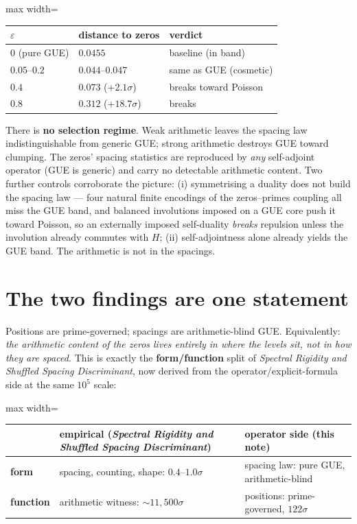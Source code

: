 \documentclass[11pt]{article}
\begin{document}
\begin{center}
\begin{adjustbox}{max width=\linewidth}\begin{tabular}{lll}
\toprule
$\varepsilon$ & distance to zeros & verdict \\
\midrule
$0$ (pure GUE) & $0.0455$ & baseline (in band) \\
$0.05$--$0.2$ & $0.044$--$0.047$ & same as GUE (cosmetic) \\
$0.4$ & $0.073$ ($+2.1\sigma$) & breaks toward Poisson \\
$0.8$ & $0.312$ ($+18.7\sigma$) & breaks \\
\bottomrule
\end{tabular}\end{adjustbox}
\end{center}

There is \textbf{no selection regime}. Weak arithmetic leaves the spacing law indistinguishable from generic GUE; strong arithmetic destroys GUE toward clumping. The zeros' spacing statistics are reproduced by \emph{any} self-adjoint operator (GUE is generic) and carry no detectable arithmetic content. Two further controls corroborate the picture: (i) symmetrising a duality does not build the spacing law --- four natural finite encodings of the zeros--primes coupling all miss the GUE band, and balanced involutions imposed on a GUE core push it toward Poisson, so an externally imposed self-duality \emph{breaks} repulsion unless the involution already commutes with $H$; (ii) self-adjointness alone already yields the GUE band. The arithmetic is not in the spacings.

\section{The two findings are one statement}

Positions are prime-governed; spacings are arithmetic-blind GUE. Equivalently: \emph{the arithmetic content of the zeros lives entirely in where the levels sit, not in how they are spaced.} This is exactly the \textbf{form/function} split of \textit{Spectral Rigidity and Shuffled Spacing Discriminant}, now derived from the operator/explicit-formula side at the same $10^5$ scale:

\begin{center}
\begin{adjustbox}{max width=\linewidth}\begin{tabular}{lll}
\toprule
& empirical (\textit{Spectral Rigidity and Shuffled Spacing Discriminant}) & operator side (this note) \\
\midrule
\textbf{form} & spacing, counting, shape: $0.4$--$1.0\sigma$ & spacing law: pure GUE, arithmetic-blind \\
\textbf{function} & arithmetic witness: $\sim\!11{,}500\sigma$ & positions: prime-governed, $122\sigma$ \\
\bottomrule
\end{tabular}\end{adjustbox}
\end{center}
\end{document}
